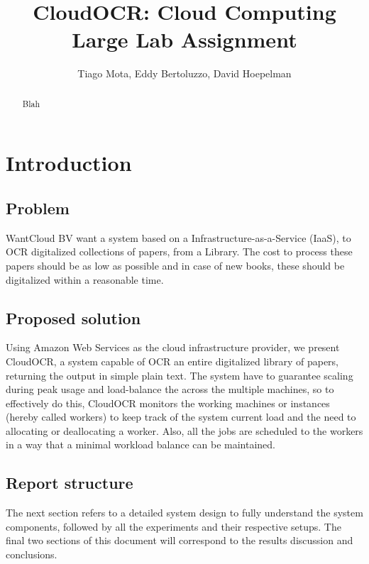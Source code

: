 \documentclass[a4paper]{IEEEtran}
\title{CloudOCR: Cloud Computing Large Lab Assignment}
\author{Tiago Mota, Eddy Bertoluzzo, David Hoepelman}
\begin{document}
\maketitle

\begin{abstract}

Blah
\end{abstract}

\section{Introduction}


\subsection{Problem}
WantCloud BV want a system based on a Infrastructure-as-a-Service (IaaS), to OCR digitalized collections of papers, from a Library. The cost to process these papers should be as low as possible and in case of new books, these should be digitalized within a reasonable time.

\subsection{Proposed solution}
Using Amazon Web Services as the cloud infrastructure provider, we present CloudOCR, a system capable of OCR an entire digitalized library of papers, returning the output in simple plain text. The system have to guarantee scaling during peak usage and load-balance the across the multiple machines, so to effectively do this, CloudOCR monitors the working machines or instances (hereby called workers) to keep track of the system current load and the need to allocating or deallocating a worker. Also, all the jobs are scheduled to the workers in a way that a minimal workload balance can be maintained.

\subsection{Report structure}
The next section refers to a detailed system design to fully understand the system components, followed by all the experiments and their respective setups. The final two sections of this document will correspond to the results discussion and conclusions.
\end{document}
